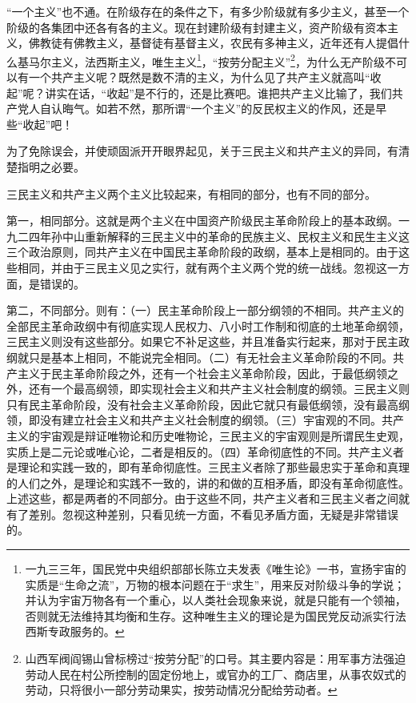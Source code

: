 \documentclass[UTF8, 12pt, a4paper]{ctexrep}
\begin{document}
“一个主义”也不通。在阶级存在的条件之下，有多少阶级就有多少主义，甚至一个阶级的各集团中还各有各的主义。现在封建阶级有封建主义，资产阶级有资本主义，佛教徒有佛教主义，基督徒有基督主义，农民有多神主义，近年还有人提倡什么基马尔主义，法西斯主义，唯生主义\footnote{一九三三年，国民党中央组织部部长陈立夫发表《唯生论》一书，宣扬宇宙的实质是“生命之流”，万物的根本问题在于“求生”，用来反对阶级斗争的学说；并认为宇宙万物各有一个重心，以人类社会现象来说，就是只能有一个领袖，否则就无法维持其均衡和生存。这种唯生主义的理论是为国民党反动派实行法西斯专政服务的。}，“按劳分配主义”\footnote{山西军阀阎锡山曾标榜过“按劳分配”的口号。其主要内容是：用军事方法强迫劳动人民在村公所控制的固定份地上，或官办的工厂、商店里，从事农奴式的劳动，只将很小一部分劳动果实，按劳动情况分配给劳动者。}，为什么无产阶级不可以有一个共产主义呢？既然是数不清的主义，为什么见了共产主义就高叫“收起”呢？讲实在话，“收起”是不行的，还是比赛吧。谁把共产主义比输了，我们共产党人自认晦气。如若不然，那所谓“一个主义”的反民权主义的作风，还是早些“收起”吧！

为了免除误会，并使顽固派开开眼界起见，关于三民主义和共产主义的异同，有清楚指明之必要。

三民主义和共产主义两个主义比较起来，有相同的部分，也有不同的部分。

第一，相同部分。这就是两个主义在中国资产阶级民主革命阶段上的基本政纲。一九二四年孙中山重新解释的三民主义中的革命的民族主义、民权主义和民生主义这三个政治原则，同共产主义在中国民主革命阶段的政纲，基本上是相同的。由于这些相同，并由于三民主义见之实行，就有两个主义两个党的统一战线。忽视这一方面，是错误的。

第二，不同部分。则有：（一）民主革命阶段上一部分纲领的不相同。共产主义的全部民主革命政纲中有彻底实现人民权力、八小时工作制和彻底的土地革命纲领，三民主义则没有这些部分。如果它不补足这些，并且准备实行起来，那对于民主政纲就只是基本上相同，不能说完全相同。（二）有无社会主义革命阶段的不同。共产主义于民主革命阶段之外，还有一个社会主义革命阶段，因此，于最低纲领之外，还有一个最高纲领，即实现社会主义和共产主义社会制度的纲领。三民主义则只有民主革命阶段，没有社会主义革命阶段，因此它就只有最低纲领，没有最高纲领，即没有建立社会主义和共产主义社会制度的纲领。（三）宇宙观的不同。共产主义的宇宙观是辩证唯物论和历史唯物论，三民主义的宇宙观则是所谓民生史观，实质上是二元论或唯心论，二者是相反的。（四）革命彻底性的不同。共产主义者是理论和实践一致的，即有革命彻底性。三民主义者除了那些最忠实于革命和真理的人们之外，是理论和实践不一致的，讲的和做的互相矛盾，即没有革命彻底性。上述这些，都是两者的不同部分。由于这些不同，共产主义者和三民主义者之间就有了差别。忽视这种差别，只看见统一方面，不看见矛盾方面，无疑是非常错误的。
\end{document}
